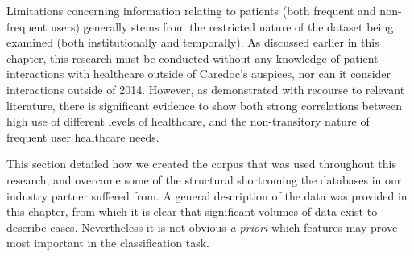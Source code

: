Limitations concerning information relating to patients (both frequent and non-frequent users) generally stems from the restricted nature of the dataset being examined (both institutionally and temporally). As discussed earlier in this chapter, this research must be conducted without any knowledge of patient interactions with healthcare outside of Caredoc's auspices, nor can it consider interactions outside of 2014. However, as demonstrated with recourse to relevant literature, there is significant evidence to show both strong correlations between high use of different levels of healthcare, and the non-transitory nature of frequent user healthcare needs.

This section detailed how we created the corpus that was used throughout this research, and overcame some of the structural shortcoming the databases in our industry partner suffered from. A general description of the data was provided in this chapter, from which it is clear that significant volumes of data exist to describe cases. Nevertheless it is not obvious \textit{a priori} which features may prove most important in the classification task. 